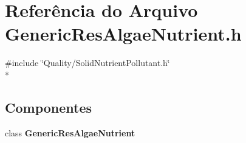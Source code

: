 \section{Referência do Arquivo Generic\+Res\+Algae\+Nutrient.\+h}
\label{_generic_res_algae_nutrient_8h}
{\ttfamily \#include \char`\"{}Quality/\+Solid\+Nutrient\+Pollutant.\+h\char`\"{}}\\*
\subsection*{Componentes}
\begin{DoxyCompactItemize}
\item 
class {\bf Generic\+Res\+Algae\+Nutrient}
\end{DoxyCompactItemize}
